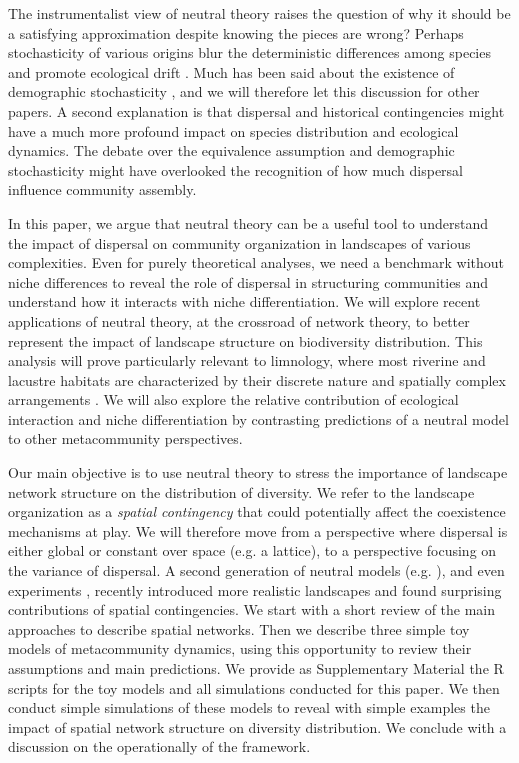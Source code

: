 \documentclass[12pt]{article}
\begin{document}
The instrumentalist view of neutral theory raises the question of why it should
be a satisfying approximation despite knowing the pieces are wrong? Perhaps
stochasticity of various origins blur the deterministic differences among
species and promote ecological drift \parencite{Gravel2011a}. Much has been said
about the existence of demographic stochasticity \parencite{Clark2012}, and we
will therefore let this discussion for other papers. A second explanation is that
dispersal and historical contingencies might have a much more profound impact on
species distribution \parencite{Bahn2007, Boulangeat2012} and ecological
dynamics. The debate over the equivalence assumption and demographic
stochasticity might have overlooked the recognition of how much dispersal
influence community assembly.

In this paper, we argue that neutral theory can be a useful tool to understand
the impact of dispersal on community organization in landscapes of various
complexities. Even for purely theoretical analyses, we need a benchmark without
niche differences to reveal the role of dispersal in structuring communities and
understand how it interacts with niche differentiation. We will explore recent
applications of neutral theory, at the crossroad of network theory, to better
represent the impact of landscape structure on biodiversity distribution. This
analysis will prove particularly relevant to limnology, where most riverine and
lacustre habitats are characterized by their discrete nature and spatially
complex arrangements \parencite{Peterson2013}. We will also explore the relative
contribution of ecological interaction and niche differentiation by contrasting
predictions of a neutral model to other metacommunity perspectives.

Our main objective is to use neutral theory to stress the importance of
landscape network structure on the distribution of diversity. We refer to the
landscape organization as a \emph{spatial contingency}
\parencite{Peres-Neto2012} that could potentially affect the coexistence
mechanisms at play. We will therefore move from a perspective where dispersal is
either global or constant over space (e.g. a lattice), to a perspective focusing
on the variance of dispersal. A second generation of neutral models (e.g.
\textcite{Economo2008, Economo2011,Desjardins2012a,Desjardins2012b}), and even
experiments \parencite{Carrara2012}, recently introduced more realistic
landscapes and found surprising contributions of spatial contingencies. We start
with a short review of the main approaches to describe spatial networks. Then we
describe three simple toy models of metacommunity dynamics, using this
opportunity to review their assumptions and main predictions. We provide as
Supplementary Material the R scripts for the toy models and all simulations
conducted for this paper. We then conduct simple simulations of these models to
reveal with simple examples the impact of spatial network structure on diversity
distribution. We conclude with a discussion on the operationally of the
framework.
\end{document}
